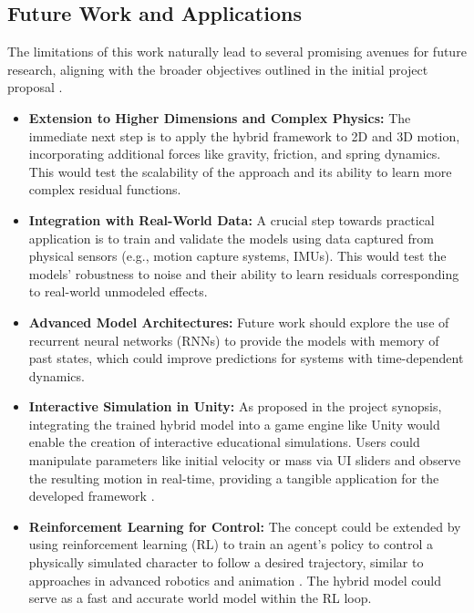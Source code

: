 \documentclass[conference]{IEEEtran}
\begin{document}
\subsection{Future Work and Applications}
The limitations of this work naturally lead to several promising avenues for future research, aligning with the broader objectives outlined in the initial project proposal \cite{b3}.
\begin{itemize}
    \item \textbf{Extension to Higher Dimensions and Complex Physics:} The immediate next step is to apply the hybrid framework to 2D and 3D motion, incorporating additional forces like gravity, friction, and spring dynamics. This would test the scalability of the approach and its ability to learn more complex residual functions.
    \item \textbf{Integration with Real-World Data:} A crucial step towards practical application is to train and validate the models using data captured from physical sensors (e.g., motion capture systems, IMUs). This would test the models' robustness to noise and their ability to learn residuals corresponding to real-world unmodeled effects.
    \item \textbf{Advanced Model Architectures:} Future work should explore the use of recurrent neural networks (RNNs) to provide the models with memory of past states, which could improve predictions for systems with time-dependent dynamics.
    \item \textbf{Interactive Simulation in Unity:} As proposed in the project synopsis, integrating the trained hybrid model into a game engine like Unity would enable the creation of interactive educational simulations. Users could manipulate parameters like initial velocity or mass via UI sliders and observe the resulting motion in real-time, providing a tangible application for the developed framework \cite{b2}.
    \item \textbf{Reinforcement Learning for Control:} The concept could be extended by using reinforcement learning (RL) to train an agent's policy to control a physically simulated character to follow a desired trajectory, similar to approaches in advanced robotics and animation \cite{b6}. The hybrid model could serve as a fast and accurate world model within the RL loop.
\end{itemize}
\end{document}
